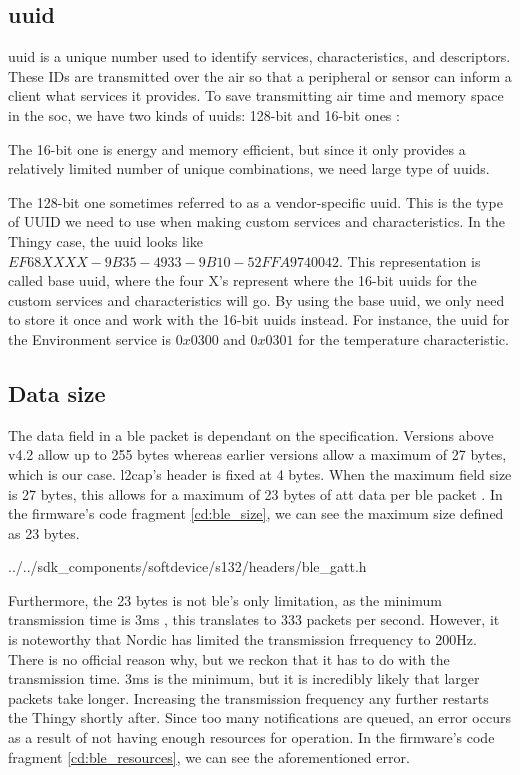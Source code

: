 \subsection{\gls{uuid}}
\gls{uuid} is a unique number used to identify services, characteristics, and descriptors. These IDs are transmitted over the air so that a peripheral or sensor can inform a client what services it provides. To save transmitting air time and memory space in the \gls{soc}, we have two kinds of \gls{uuid}s: 128-bit and 16-bit ones \cite{uuid}:

The 16-bit one is energy and memory efficient, but since it only provides a relatively limited number of unique combinations, we need large type of \gls{uuid}s.

The 128-bit one sometimes referred to as a vendor-specific \gls{uuid}. This is the type of UUID we need to use when making custom services and characteristics. In the Thingy case, the \gls{uuid} looks like $EF68XXXX-9B35-4933-9B10-52FFA9740042$. This representation is called base \gls{uuid}, where the four X's represent where the 16-bit \gls{uuid}s for the custom services and characteristics will go. By using the base \gls{uuid}, we only need to store it once and work with the 16-bit \gls{uuid}s instead. For instance, the \gls{uuid} for the Environment service is $0x0300$ and $0x0301$ for the temperature characteristic.

\subsection{Data size}
The data field in a \gls{ble} packet is dependant on the \bt specification. Versions above v4.2 allow up to 255 bytes whereas earlier versions allow a maximum of 27 bytes, which is our case. \gls{l2cap}'s header is fixed at 4 bytes. When the maximum field size is 27 bytes, this allows for a maximum of 23 bytes of \gls{att} data per \gls{ble} packet \cite{blesize}. In the firmware's code fragment \ref{cd:ble_size}, we can see the maximum size defined as 23 bytes.


{../../sdk_components/softdevice/s132/headers/ble_gatt.h}


Furthermore, the 23 bytes is not \gls{ble}'s only limitation, as the minimum transmission time is 3ms \cite{bletime}, this translates to 333 packets per second. However, it is noteworthy that Nordic has limited the transmission frrequency to 200Hz. There is no official reason why, but we reckon that it has to do with the transmission time. 3ms is the minimum, but it is incredibly likely that larger packets take longer. Increasing the transmission frequency any further restarts the Thingy shortly after. Since too many notifications are queued, an error occurs as a result of not having enough resources for operation. In the firmware's code fragment \ref{cd:ble_resources}, we can see the aforementioned error.

